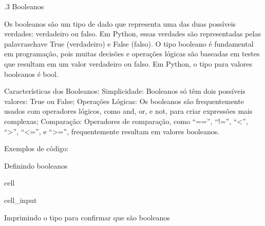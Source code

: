 \documentclass[letterpaper,10pt,english]{jupyterBook}
\begin{document}
.3 Booleanos

\sphinxAtStartPar
Os booleanos são um tipo de dado que representa uma das duas possíveis verdades: verdadeiro ou falso. Em Python, essas verdades são representadas pelas palavras\sphinxhyphen{}chave True (verdadeiro) e False (falso). O tipo booleano é fundamental em programação, pois muitas decisões e operações lógicas são baseadas em testes que resultam em um valor verdadeiro ou falso. Em Python, o tipo para valores booleanos é bool.

\sphinxAtStartPar
Características dos Booleanos:
Simplicidade: Booleanos só têm dois possíveis valores: True ou False;
Operações Lógicas: Os booleanos são frequentemente usados com operadores lógicos, como and, or, e not, para criar expressões mais complexas;
Comparação: Operadores de comparação, como “==”, “!=”, “<”, “>”, “<=”, e “>=”, frequentemente resultam em valores booleanos.

\sphinxAtStartPar
Exemplos de código:

\sphinxAtStartPar
Definindo booleanos

\begin{sphinxuseclass}{cell}\begin{sphinxVerbatimInput}

\begin{sphinxuseclass}{cell_input}
\begin{sphinxVerbatim}[commandchars=\\\{\}]
  
  
\end{sphinxVerbatim}

\end{sphinxuseclass}\end{sphinxVerbatimInput}

\end{sphinxuseclass}
\sphinxAtStartPar
Imprimindo o tipo para confirmar que são booleanos
\end{document}
